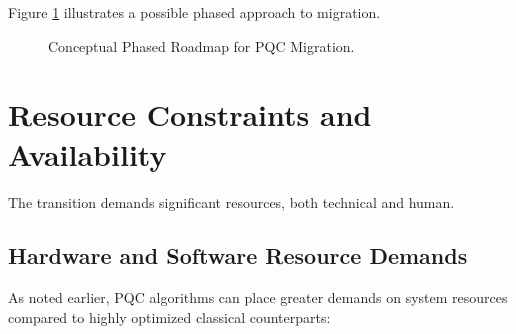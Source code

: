 Figure \ref{fig:pqc_migration_roadmap_ch7} illustrates a possible phased approach to migration.

\begin{figure}[htbp]
    \centering
    \caption{Conceptual Phased Roadmap for PQC Migration.}
    \label{fig:pqc_migration_roadmap_ch7}
\end{figure}

\section{Resource Constraints and Availability}\label{sec:resources_ch7_rev}
The transition demands significant resources, both technical and human.

\subsection{Hardware and Software Resource Demands}\label{subsec:hw_sw_reqs_ch7_rev}
As noted earlier, PQC algorithms can place greater demands on system resources compared to highly optimized classical counterparts:

